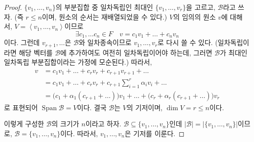 \documentclass[unfonts,oneside,a4paper]{oblivoir}
\theoremstyle{definition}
\theoremstyle{theorem}
\theoremstyle{theorem}
\theoremstyle{remark}
\theoremstyle{remark}
\theoremstyle{remark}
\theoremstyle{remark}
\renewcommand{\vec}[1]{\bm{\mathit{#1}}}
\DeclareMathOperator{\Span}{Span}
\begin{document}
\begin{proof}
    $\{\vec v_1, \dots, \vec v_n\}$의 부분집합 중 일차독립인 최대인 $\{\vec v_1, \dots, \vec v_r\}$을 고르고, $\mathcal B$라고 쓰자.
    (즉 $r \leq n$이며, 원소의 순서는 재배열되었을 수 있다.)
    $V$의 임의의 원소 $\vec v$에 대해서, $V = \left<\vec v_1, \dots, \vec v_n\right>$이므로
    \begin{equation*}
        \exists c_1, \dots c_n \in F \quad \vec v = c_1 \vec v_1 + \dots + c_n \vec v_n
    \end{equation*}
    이다.
    그런데 $\vec v_{r + 1}, \dots$은 $\mathcal B$와 일차종속이므로 $\vec v_1, \dots, \vec v_r$로 다시 쓸 수 있다.
    (일차독립이라면 해당 벡터를 $\mathcal B$에 추가하여도 여전히 일차독립이어야 하는데, 그러면 $\mathcal B$가 최대인 일차독립 부분집합이라는 가정에 모순된다.)
    따라서,
    \begin{align*}
        \vec v &= c_1 \vec v_1 + \dots + c_r \vec v_r + c_{r + 1} \vec v_{r + 1} + \dots\\
               &= c_1 \vec v_1 + \dots + c_r \vec v_r + c_{r + 1} \sum_{i = 1}^r \alpha_i \vec v_i + \dots\\
               &= \bigl(c_1 + \alpha_1 (c_{r + 1} + \dots)\bigr) \vec v_1 + \dots + \bigl(c_r + \alpha_r (c_{r + 1} + \dots)\bigr) \vec v_r
    \end{align*}
    로 표현되어 $\Span \mathcal B = V$이다.
    결국 $\mathcal B$는 $V$의 기저이며, $\dim V = r \leq n$이다.

    이렇게 구성한 $\mathcal B$의 크기가 $n$이라고 하자.
    $\mathcal B \subseteq \{\vec v_1, \dots, \vec v_n\}$인데 $|\mathcal B| = \bigl|\{\vec v_1, \dots, \vec v_n\}\bigr|$이므로, $\mathcal B = \{\vec v_1, \dots, \vec v_n\}$이다.
    따라서, $\vec v_1, \dots, \vec v_n$은 기저를 이룬다.
\end{proof}
\end{document}
